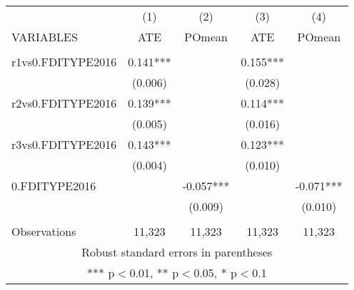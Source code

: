 \documentclass[]{article}
\begin{document}
\begin{tabular}{lcccc} \hline
 & (1) & (2) & (3) & (4) \\
VARIABLES & ATE & POmean & ATE & POmean \\ \hline
 &  &  &  &  \\
r1vs0.FDITYPE2016 & 0.141*** &  & 0.155*** &  \\
 & (0.006) &  & (0.028) &  \\
r2vs0.FDITYPE2016 & 0.139*** &  & 0.114*** &  \\
 & (0.005) &  & (0.016) &  \\
r3vs0.FDITYPE2016 & 0.143*** &  & 0.123*** &  \\
 & (0.004) &  & (0.010) &  \\
0.FDITYPE2016 &  & -0.057*** &  & -0.071*** \\
 &  & (0.009) &  & (0.010) \\
 &  &  &  &  \\
 Observations & 11,323 & 11,323 & 11,323 & 11,323 \\ \hline
\multicolumn{5}{c}{ Robust standard errors in parentheses} \\
\multicolumn{5}{c}{ *** p$<$0.01, ** p$<$0.05, * p$<$0.1} \\
\end{tabular}
\end{document}
